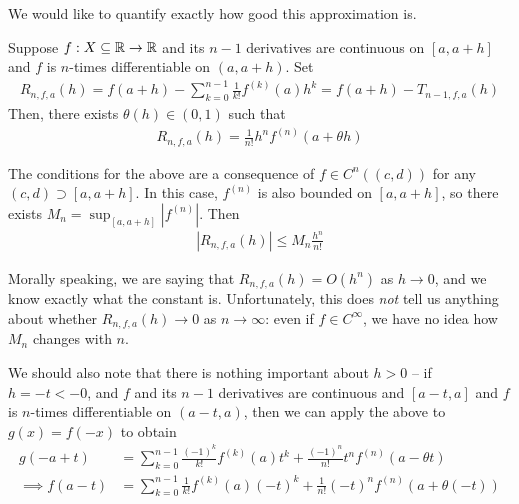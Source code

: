 \documentclass{../template/note}
\begin{document}
    We would like to quantify exactly how good this approximation is.

    \begin{theorem}
        \label{taylor-lagrange}
        Suppose \(f: X \subseteq \mathbb R \to \mathbb R\) and its \(n-1\) derivatives are continuous on \([a, a+h]\) and \(f\) is \(n\)-times differentiable on \((a, a+h)\). Set
        \begin{align*}
            R_{n, f, a}(h) = f(a+h) - \sum_{k=0}^{n-1} \frac 1 {k!} f^{(k)}(a) h^k = f(a+h) - T_{n-1, f, a}(h)
        \end{align*}
        Then, there exists \(\theta(h) \in (0, 1)\) such that
        \begin{align*}
            R_{n, f, a}(h) = \frac 1 {n!} h^n f^{(n)}(a+\theta h) 
        \end{align*}
    \end{theorem}
    
    \begin{remark*}
        The conditions for the above are a consequence of \(f \in C^n((c, d))\) for any \((c, d) \supset [a, a+h]\). In this case, \(f^{(n)}\) is also bounded on \([a, a+h]\), so there exists \(M_n = \sup_{[a, a+h]}|f^{(n)}|\). Then
        \begin{align*}
            |R_{n,f,a}(h)| \leq M_n \frac{h^n}{n!}
        \end{align*}
    \end{remark*}

    Morally speaking, we are saying that \(R_{n, f, a}(h) = O(h^n)\) as \(h \to 0\), and we know exactly what the constant is. Unfortunately, this does \emph{not} tell us anything about whether \(R_{n, f, a}(h) \to 0\) as \(n \to \infty\): even if \(f \in C^\infty\), we have no idea how \(M_n\) changes with \(n\).

    \begin{remark*}
        We should also note that there is nothing important about \(h > 0\) -- if \(h = -t < -0\), and \(f\) and its \(n-1\) derivatives are continuous and \([a-t, a]\) and \(f\) is \(n\)-times differentiable on \((a-t, a)\), then we can apply the above to \(g(x) = f(-x)\) to obtain
        \begin{align*}
            g(-a+t) &= \sum_{k=0}^{n-1} \frac{(-1)^k}{k!} f^{(k)}(a) t^k + \frac{(-1)^n}{n!}t^n f^{(n)}(a-\theta t) \\
            \implies f(a-t) &= \sum_{k=0}^{n-1} \frac{1}{k!} f^{(k)}(a)(-t)^k + \frac{1}{n!}(-t)^n f^{(n)}(a+\theta(-t))
        \end{align*}
    \end{remark*}
    
\end{document}
